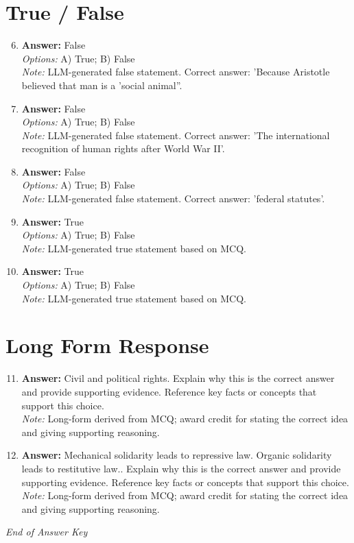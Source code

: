 \documentclass[12pt]{article}
\begin{document}
\section*{True / False}
\begin{enumerate}[label=\arabic*.]
\setcounter{enumi}{5}
\item \textbf{Answer:} False
\\ \textit{Options:} A) True; B) False
\\ \textit{Note:} LLM-generated false statement. Correct answer: 'Because Aristotle believed that man is a 'social animal''.
\item \textbf{Answer:} False
\\ \textit{Options:} A) True; B) False
\\ \textit{Note:} LLM-generated false statement. Correct answer: 'The international recognition of human rights after World War II'.
\item \textbf{Answer:} False
\\ \textit{Options:} A) True; B) False
\\ \textit{Note:} LLM-generated false statement. Correct answer: 'federal statutes'.
\item \textbf{Answer:} True
\\ \textit{Options:} A) True; B) False
\\ \textit{Note:} LLM-generated true statement based on MCQ.
\item \textbf{Answer:} True
\\ \textit{Options:} A) True; B) False
\\ \textit{Note:} LLM-generated true statement based on MCQ.
\end{enumerate}

\section*{Long Form Response}
\begin{enumerate}[label=\arabic*.]
\setcounter{enumi}{10}
\item \textbf{Answer:} Civil and political rights. Explain why this is the correct answer and provide supporting evidence. Reference key facts or concepts that support this choice.
\\ \textit{Note:} Long-form derived from MCQ; award credit for stating the correct idea and giving supporting reasoning.
\item \textbf{Answer:} Mechanical solidarity leads to repressive law. Organic solidarity leads to restitutive law.. Explain why this is the correct answer and provide supporting evidence. Reference key facts or concepts that support this choice.
\\ \textit{Note:} Long-form derived from MCQ; award credit for stating the correct idea and giving supporting reasoning.
\end{enumerate}

\vfill
\noindent\textit{End of Answer Key}
\end{document}
